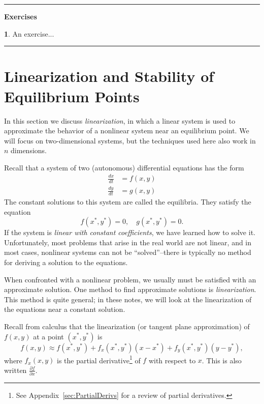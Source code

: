 \documentclass[reqno]{immbook}
\numberwithin{equation}{chapter}
\numberwithin{question}{section}
\numberwithin{theorem}{chapter}
\numberwithin{figure}{chapter}
\theoremstyle{definition}
\newtheorem{exercise}{}[section]
\newenvironment{exercises}%
{%
\medskip\hrule\medskip\noindent\textbf{Exercises}%
}%
{%
\medskip\hrule
}
\begin{document}
\begin{exercises}
\begin{exercise}
An exercise...
\end{exercise}
\end{exercises}

\newpage

\section{Linearization and Stability of Equilibrium Points}
\label{sec:DELinearization}

In this section we discuss \emph{linearization},
in which a linear system
is used to approximate the behavior of a nonlinear system
near an equilibrium point.
We will focus on two-dimensional systems, but the
techniques used here also work in $n$ dimensions.

Recall that a system of two (autonomous) differential equations has the form
\begin{equation}
\begin{split}
  \frac{dx}{dt} & = f(x,y) \\
  \frac{dy}{dt} & = g(x,y)
\end{split}
\label{eqn:de}
\end{equation}
The constant solutions to this system are called the equilibria.
They satisfy the equation
\begin{equation}
    f(x^*,y^*) = 0, \quad g(x^*,y^*) = 0.
\end{equation}
If the system is \emph{linear with constant
coefficients}, we have learned
how to solve it.  Unfortunately, most problems that arise in the
real world are not linear,
and in most cases, nonlinear systems can not be ``solved''--there is
typically no method for deriving a solution to the equations.

When confronted with a nonlinear problem, we usually must
be satisfied with an approximate solution.
One method to find approximate solutions is \emph{linearization}.
This method is quite general; in these notes, we will look at the
linearization of the equations near a constant solution.

Recall from calculus
that the linearization (or tangent plane approximation)
of $f(x,y)$ at a point $(x^*,y^*)$ is
\begin{equation}
  f(x,y) \approx f(x^*,y^*)+f_x(x^*,y^*)(x-x^*) + f_y(x^*,y^*)(y-y^*),
\end{equation}
where $f_x(x,y)$ is the partial derivative\footnote{%
See Appendix~\ref{sec:PartialDerivs} for a review
of partial derivatives.}
of $f$ with respect to $x$.
This is also written $\frac{\partial f}{\partial x}$.
\end{document}
